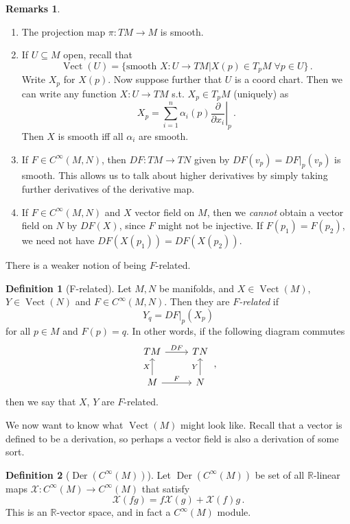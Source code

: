 \documentclass[a4paper,11pt]{article}
\theoremstyle{definition}
\newtheorem*{defn}{Definition}
\newtheorem*{rmks}{Remarks}
\DeclareMathOperator{\Vect}{Vect}
\DeclareMathOperator{\Der}{Der}
\numberwithin{equation}{section}
\begin{document}
\begin{rmks}
\leavevmode
\begin{enumerate}
    \item The projection map $\pi:TM\rightarrow M$ is smooth.
    \item If $U\subseteq M$ open, recall that
    \[
    \Vect(U)=\{\text{smooth }X:U\rightarrow TM|X(p)\in T_pM\;\forall p\in U\}\,.
    \]
    Write $X_p$ for $X(p)$. Now suppose further that $U$ is a coord chart. Then we can write any function $X:U\rightarrow TM$ s.t. $X_p\in T_pM$ (uniquely) as
    \[
    X_p=\sum_{i=1}^n\alpha_i(p)\left.\frac{\partial}{\partial x_i}\right|_p\,.
    \]
    Then $X$ is smooth iff all $\alpha_i$ are smooth.
    \item If $F\in C^\infty(M,N)$, then $DF:TM\rightarrow TN$ given by $DF(v_p)=DF|_p(v_p)$ is smooth. This allows us to talk about higher derivatives by simply taking further derivatives of the derivative map.
    \item If $F\in C^\infty(M,N)$ and $X$ vector field on $M$, then we \emph{cannot} obtain a vector field on $N$ by $DF(X)$, since $F$ might not be injective. If $F(p_1)=F(p_2)$, we need not have $DF(X(p_1))=DF(X(p_2))$.
\end{enumerate}
\end{rmks}

There is a weaker notion of being $F$-related.
\begin{defn}[F-related]
Let $M,N$ be manifolds, and $X\in\Vect(M)$, $Y\in\Vect(N)$ and $F\in C^\infty(M,N)$. Then they are $F$\emph{-related} if
\[
Y_q=DF|_p(X_p)
\]
for all $p\in M$ and $F(p)=q$. In other words, if the following diagram commutes
\[
\begin{tikzcd}
TM\arrow{r}{DF}&TN\\
M\arrow{u}{X}\arrow{r}{F}&N\arrow{u}{Y}
\end{tikzcd}\,,
\]
then we say that $X$, $Y$ are $F$-related.
\end{defn}

We now want to know what $\Vect(M)$ might look like. Recall that a vector is defined to be a derivation, so perhaps a vector field is also a derivation of some sort.

\begin{defn}[$\Der(C^\infty(M))$]
Let $\Der(C^\infty(M))$ be set of all $\mathbb{R}$-linear maps $\mathcal{X}:C^\infty(M)\rightarrow C^\infty(M)$ that satisfy
\[
\mathcal{X}(fg)=f\mathcal{X}(g)+\mathcal{X}(f)g\,.
\]
This is an $\mathbb{R}$-vector space, and in fact a $C^\infty(M)$ module.
\end{defn}
\end{document}
